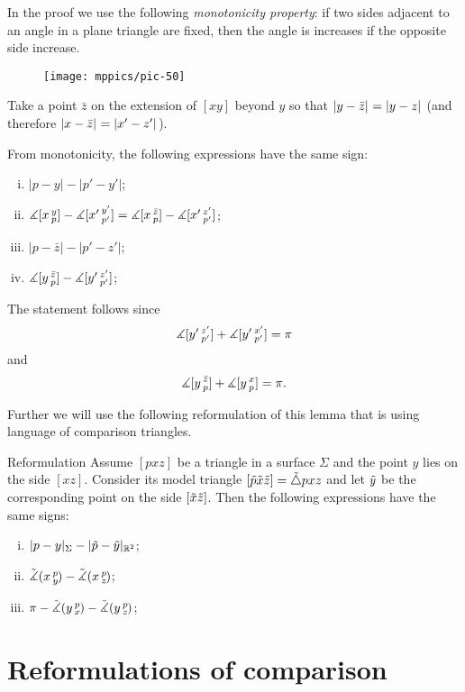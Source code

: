 In the proof we use the following \emph{monotonicity property}:
if two sides adjacent to an angle in a plane triangle are fixed, 
then the angle is increases if the opposite side increase.

\begin{figure}[h!]
\vskip-0mm
\centering
\texttt{[image: mppics/pic-50]}
\vskip-0mm
\end{figure}

Take 
a point $\bar z$ on the extension of 
$[xy]$ beyond $y$ so that $\dist{y}{\bar z}{}=\dist{y}{z}{}$ (and therefore $\dist{x}{\bar z}{}=\dist{x'}{z'}{}$). 
 
From monotonicity, 
the following expressions have the same sign:
\begin{enumerate}[(i)]
\item $|p-y|-|p'-y'|$;
\item $\measuredangle\hinge{x}{y}{p}-\measuredangle\hinge{x'}{y'}{p'}=\measuredangle\hinge{x}{\bar z}{p}-\measuredangle\hinge{x'}{z'}{p'}$;
\item $|p-\bar z|-|p'-z'|$;
\item $\measuredangle\hinge{y}{\bar z}{p}-\measuredangle\hinge{y'}{z'}{p'}$;
\end{enumerate}
The statement follows since
\[\measuredangle\hinge{y'}{z'}{p'}+\measuredangle\hinge{y'}{x'}{p'}=\pi\]
and
\[\measuredangle\hinge{y}{\bar z}{p}+\measuredangle\hinge{y}{x}{p}=\pi.\]
\qedsf

Further we will use the following reformulation of this lemma that is using language of comparison triangles.

\begin{thm}{Reformulation}\label{lem:alex-reformulation}
\label{lem:alex}
Assume $[pxz]$ be a triangle in a surface $\Sigma$ and 
the point $y$ lies on the side $[xz]$.
Consider its model triangle $[\~p\~x\~z]=\~\triangle pxz$ and let $\~y$ be the corresponding point on the side $[\~x\~z]$.
Then the following expressions have the same signs:
\begin{enumerate}[(i)]
 \item $|p-y|_\Sigma-|\~p-\~y|_{\RR^2}$;
 \item $\angk xpy-\angk {x}{p}{z}$;
 \item $\pi-\angk ypx-\angk ypz$;
\end{enumerate}
\end{thm}

\section{Reformulations of comparison}

